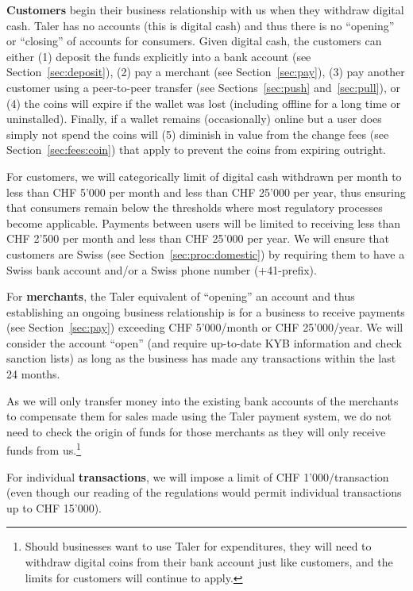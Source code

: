 \documentclass[10pt,a4paper,oneside]{book}
\begin{document}
{\bf Customers} begin their business relationship with us when they withdraw
digital cash.  Taler has no accounts (this is digital cash) and thus there is
no ``opening'' or ``closing'' of accounts for consumers.  Given digital cash,
the customers can either (1) deposit the funds explicitly into a bank account
(see Section~\ref{sec:deposit}), (2) pay a merchant (see
Section~\ref{sec:pay}), (3) pay another customer using a peer-to-peer
transfer (see Sections~\ref{sec:push} and~\ref{sec:pull}), or (4) the coins
will expire if the wallet was lost (including offline for a long time or
uninstalled).  Finally, if a wallet remains (occasionally) online but a user
does simply not spend the coins will (5) diminish in value from the change
fees (see Section~\ref{sec:fees:coin}) that apply to prevent the coins from
expiring outright.

For customers, we will categorically limit of digital cash withdrawn per month
to less than CHF 5'000 per month and less than CHF 25'000 per year, thus
ensuring that consumers remain below the thresholds where most regulatory
processes become applicable.  Payments between users will be limited
to receiving less than CHF 2'500 per month and less than CHF 25'000 per year.
We will ensure that customers are Swiss
(see Section~\ref{sec:proc:domestic}) by requiring them to have a Swiss bank
account and/or a Swiss phone number (+41-prefix).

For {\bf merchants}, the Taler equivalent of ``opening'' an account and thus
establishing an ongoing business relationship is for a business to receive
payments (see Section~\ref{sec:pay}) exceeding CHF 5'000/month or CHF
25'000/year.  We will consider the account ``open'' (and require up-to-date KYB
information and check sanction lists) as long as the business has made any
transactions within the last 24 months.

As we will only transfer money into the existing bank accounts of the
merchants to compensate them for sales made using the Taler payment system, we
do not need to check the origin of funds for those merchants as they will only
receive funds from us.\footnote{Should businesses want to use Taler for
expenditures, they will need to withdraw digital coins from their bank account
just like customers, and the limits for customers will continue to apply.}

For individual {\bf transactions}, we will impose a limit of CHF
1'000/transaction (even though our reading of the regulations would permit
individual transactions up to CHF 15'000).
\end{document}
